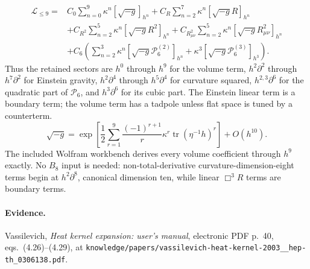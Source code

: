 \documentclass[11pt]{article}
\begin{document}
\[
\begin{aligned}
\mathcal L_{\leq9}={}&C_0\sum_{n=0}^{9}\kappa^n[\sqrt{-g}]_{h^n}+C_R\sum_{n=2}^{7}\kappa^n[\sqrt{-g}R]_{h^n}\\
&+C_{R^2}\sum_{n=2}^{5}\kappa^n[\sqrt{-g}R^2]_{h^n}+C_{R_{\mu\nu}^2}\sum_{n=2}^{5}\kappa^n[\sqrt{-g}R_{\mu\nu}^2]_{h^n}\\
&+C_6\left(\sum_{n=2}^{3}\kappa^n[\sqrt{-g}\mathcal P_6^{(2)}]_{h^n}+\kappa^3[\sqrt{-g}\mathcal P_6^{(3)}]_{h^3}\right).
\end{aligned}
\]
Thus the retained sectors are $h^0$ through $h^9$ for the volume term, $h^2\partial^2$ through $h^7\partial^2$ for Einstein gravity, $h^2\partial^4$ through $h^5\partial^4$ for curvature squared, $h^{2,3}\partial^6$ for the quadratic part of $\mathcal P_6$, and $h^3\partial^6$ for its cubic part. The Einstein linear term is a boundary term; the volume term has a tadpole unless flat space is tuned by a counterterm.
\[
\sqrt{-g}=\exp\!\left[\frac12\sum_{r=1}^{9}\frac{(-1)^{r+1}}r\kappa^r\operatorname{tr}(\eta^{-1}h)^r\right]+O(h^{10}).
\]
The included Wolfram workbench derives every volume coefficient through $h^9$ exactly. No $B_8$ input is needed: non-total-derivative curvature-dimension-eight terms begin at $h^2\partial^8$, canonical dimension ten, while linear $\Box^3R$ terms are boundary terms.
\paragraph{Evidence.} Vassilevich, \emph{Heat kernel expansion: user's manual}, electronic PDF p.~40, eqs.~(4.26)--(4.29), at \texttt{knowledge/papers/vassilevich-heat-kernel-2003\_\_hep-th\_0306138.pdf}.
\end{document}
